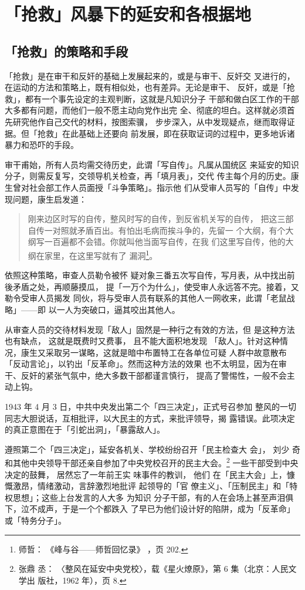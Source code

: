 \chapter{「抢救」风暴下的延安和各根据地}

\section{「抢救」的策略和手段}

「抢救」是在审干和反奸的基础上发展起来的，或是与审干、反奸交
叉进行的，在运动的方法和策略上，既有相似处，也有差异。无论是审干、
反奸，或是「抢救」，都有一个事先设定的主观判断，这就是凡知识分子
干部和做白区工作的干部大多都有问题，而他们一般不愿主动向党作出完
全、彻底的坦白。这样就必须首先研究他作自己交代的材料，按图索骥，
步步深入，从中发现疑点，继而取得证据。但「抢救」在此基础上还要向
前发展，即在获取证词的过程中，更多地诉诸暴力和恐吓的手段。

审干甫始，所有人员均需交待历史，此谓「写自传」。凡属从国统区
来延安的知识分子，则需反复写，交领导机关检查，再「填月表」，交代
传主每个月的历史。康生曾对社会部工作人员面授「斗争策略」。指示他
们从受审人员写的「自传」中发现问题，康生启发道：
\begin{quote}
\fzwkai	刚来边区时写的自传，整风时写的自传，到反省机关写的自传，
把这三部自传一对照就矛盾百出。有怕出毛病而挨斗争的，先留一
个大纲，有个大纲写一百遍都不会错。你就叫他当面写自传，在我
们这里写自传，他的大纲在家里，在这里写就有了
漏洞\footnote{师哲：
《峰与谷——师哲回忆录》
，页 202.}。
\end{quote}

依照这种策略，审查人员勒令被怀
疑对象三番五次写自传，写月表，从中找出前後矛盾之处，再顺藤摸瓜，
提「一万个为什么」，使受审人永远答不完。接着，又勒令受审人员揭发
同伙，将与受审人员有联系的其他人一网收来，此谓「老鼠战略」——即
以一人为突破口，逼其咬出其他人。

从审查人员的交待材料发现「敌人」固然是一种行之有效的方法，但 是这种方法
也有缺点， 这就是既费时又费事， 且不能大面积地发现 「敌人」。针对这种情
况，康生又采取另一谋略，这就是暗中布置特工在各单位可疑 人群中故意散布
「反动言论」，以钓出「反革命」。然而这种方法的效果 也不太明显，因为在审
干、反奸的紧张气氛中，绝大多数干部都谨言慎行， 提高了警惕性，一般不会主
动上钩。

1943 年 4 月 3 日，中共中央发出第二个「四三决定」，正式号召参加
整风的一切同志大胆说话，互相批评，以大民主的方式，来批评领导，揭
露错误。此项决定的真正意图在于「引蛇出洞」，「暴露敌人」。

遵照第二个「四三决定」，延安各机关、学校纷纷召开「民主检查大 会」， 刘少
奇和其他中央领导干部还亲自参加了中央党校召开的民主大会。\footnote{张鼎
丞： 〈整风在延安中央党校〉，载《星火燎原》，第 6 集（北京：人民文学出
版社，1962 年），页 8.} 一些干部受到中央决定的鼓舞， 居然忘了一年前王实
味事件的教训， 他们 在「民主大会」上，慷慨激昂，情绪激动，言辞激烈地批评
起领导的「官 僚主义」、「压制民主」和「特权思想」；这些上台发言的人大多
为知识 分子干部，有的人在会场上甚至声泪俱下，泣不成声，于是一个个都跌入
了早已为他们设计好的陷阱，成为「反革命」或「特务分子」。

